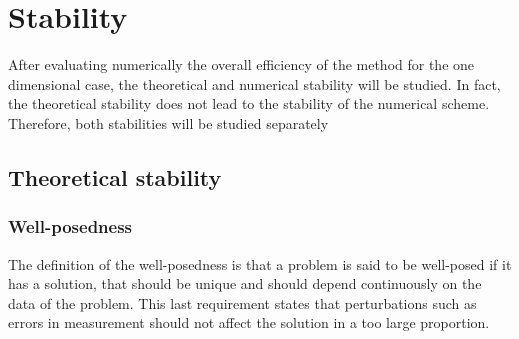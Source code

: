 \section{Stability}
After evaluating numerically the overall efficiency of the method for the one dimensional case, the theoretical and numerical stability will be studied. In fact, the theoretical stability does not lead to the stability of the numerical scheme. Therefore, both stabilities will be studied separately
\subsection{Theoretical stability}
\subsubsection{Well-posedness}
The definition of the well-posedness is that a problem is said to be well-posed if it has a solution, that should be unique and should depend continuously on the data of the problem. This last requirement states that perturbations such as errors in measurement should not affect the solution in a too large proportion. 


